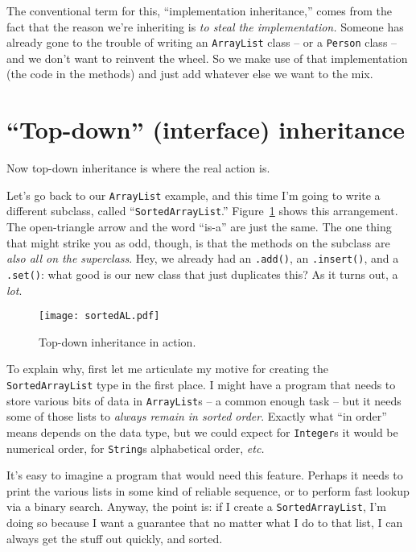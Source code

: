 The conventional term for this, ``implementation inheritance,'' comes from the
fact that the reason we're inheriting is \textit{to steal the implementation.}
Someone has already gone to the trouble of writing an \texttt{ArrayList} class
-- or a \texttt{Person} class -- and we don't want to reinvent the wheel. So
we make use of that implementation (the code in the methods) and just add
whatever else we want to the mix.


\section{``Top-down'' (interface) inheritance}

Now top-down inheritance is where the real action is.

Let's go back to our \texttt{ArrayList} example, and this time I'm going to
write a different subclass, called ``\texttt{SortedArrayList}.''
Figure~\ref{fig:sortedAL} shows this arrangement. The open-triangle arrow and
the word ``is-a'' are just the same. The one thing that might strike you as
odd, though, is that the methods on the subclass are \textit{also all on the
superclass}. Hey, we already had an \texttt{.add()}, an \texttt{.insert()},
and a \texttt{.set()}: what good is our new class that just duplicates this?
As it turns out, a \textit{lot}.

\begin{figure}
\centering
\texttt{[image: sortedAL.pdf]}
\caption{Top-down inheritance in action.}
\label{fig:sortedAL}
\end{figure}

To explain why, first let me articulate my motive for creating the
\texttt{SortedArrayList} type in the first place. I might have a program that
needs to store various bits of data in \texttt{ArrayList}s -- a common enough
task -- but it needs some of those lists to \textit{always remain in sorted
order}. Exactly what ``in order'' means depends on the data type, but we could
expect for \texttt{Integer}s it would be numerical order, for \texttt{String}s
alphabetical order, \textit{etc.}

It's easy to imagine a program that would need this feature. Perhaps it needs
to print the various lists in some kind of reliable sequence, or to perform
fast lookup via a binary search. Anyway, the point is: if I create a
\texttt{SortedArrayList}, I'm doing so because I want a guarantee that no
matter what I do to that list, I can always get the stuff out quickly, and
sorted.

